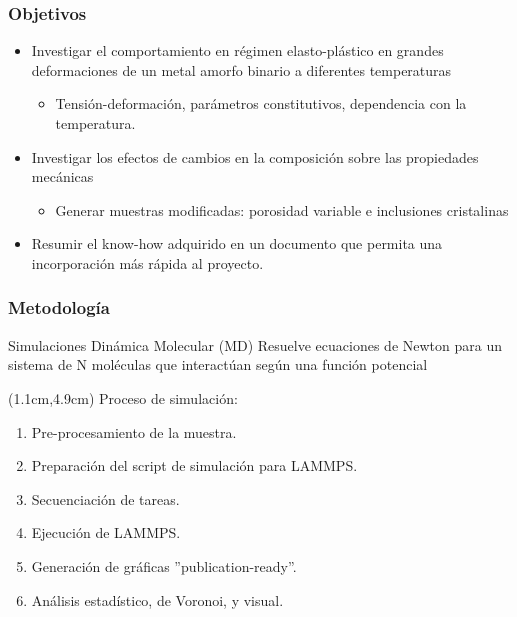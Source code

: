 \begin{frame}
 \frametitle{Objetivos}
\begin{itemize}
 \item Investigar el comportamiento en r\'egimen elasto-pl\'astico en grandes deformaciones de un metal amorfo binario a diferentes temperaturas
 \begin{itemize}
  \item Tensión-deformación, parámetros constitutivos, dependencia con la temperatura.
 \end{itemize}
 \item Investigar los efectos de cambios en la composici\'on sobre las propiedades mec\'anicas
 \begin{itemize}
  \item Generar muestras modificadas: porosidad variable e inclusiones cristalinas
 \end{itemize}
 \item Resumir el know-how adquirido en un documento que permita una incorporación más rápida al proyecto.
\end{itemize}
\end{frame}

\begin{frame}
 \frametitle{Metodología}
 \begin{block}{Simulaciones Din\'amica Molecular (MD)}
  Resuelve ecuaciones de Newton para un sistema de N mol\'eculas que interact\'uan seg\'un una funci\'on potencial
 \end{block}
 \begin{textblock*}{12cm}(1.1cm,4.9cm)
  Proceso de simulación:
  \begin{enumerate}
   \item Pre-procesamiento de la muestra.
   \item Preparación del script de simulación para LAMMPS.
   \item Secuenciación de tareas.
   \item Ejecución de LAMMPS.
   \item Generación de gráficas ''publication-ready''.
   \item Análisis estadístico, de Voronoi, y visual.
  \end{enumerate}
 \end{textblock*}
\end{frame}
